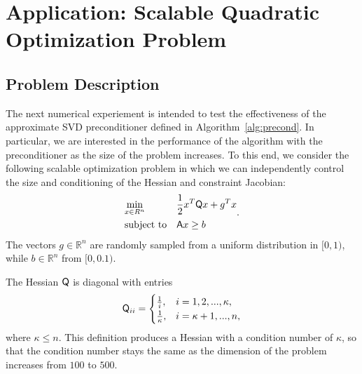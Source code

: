 \newpage
\section{Application: Scalable Quadratic Optimization Problem}
\subsection{Problem Description}
The next numerical experiement is intended to test the effectiveness of the approximate SVD
preconditioner defined in Algorithm~\ref{alg:precond}.  In particular, we are
interested in the performance of the algorithm with the preconditioner as the size of the problem increases.  
To this end, we consider the following scalable optimization problem
in which we can independently control the size and conditioning of the Hessian
and constraint Jacobian:
\begin{equation}\label{eq:quadra}
  \begin{aligned}
    &\underset{x \in R^n} {\text{min}}  
    & & \frac{1}{2}x^T \mathsf{Q} x + g^T x \\
    &\text{subject to} & & \mathsf{A}x \geq b  \\
  \end{aligned}.
\end{equation}
The vectors $g\in \mathbb{R}^{n}$ are randomly sampled from a uniform distribution 
in $[ 0,1)$, while $b \in \mathbb{R}^{n}$ from $[0,0.1)$. 

The Hessian $\mathsf{Q}$ is diagonal with entries
\begin{equation*}
  \mathsf{Q}_{ii} = \begin{cases}
    \frac{1}{i}, &  i = 1, 2, ...,  \kappa, \\
    \frac{1}{\kappa}, & i =  \kappa+1, ... , n, \\
  \end{cases}
\end{equation*}
where $\kappa \leq n$.  This definition produces a Hessian with a condition
number of $\kappa$,  so that the condition number
stays the same as the dimension of the problem increases from $100$ to $500$. 

